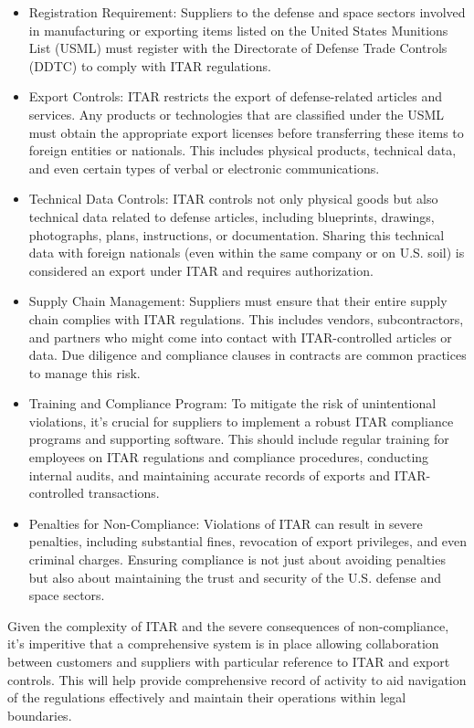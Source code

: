 \documentclass{tufte-handout}
\begin{document}
\begin{itemize}
\item Registration Requirement: Suppliers to the defense and space sectors involved in manufacturing or exporting items listed on the United States Munitions
List (USML) must register with the Directorate of Defense Trade Controls (DDTC) to comply with ITAR regulations.
\item Export Controls: ITAR restricts the export of defense-related articles and services. Any products or technologies that are classified under the USML must
obtain the appropriate export licenses before transferring these items to foreign entities or nationals. This includes physical products, technical data, and
even certain types of verbal or electronic communications.
\item Technical Data Controls: ITAR controls not only physical goods but also technical data related to defense articles, including blueprints, drawings, photographs,
plans, instructions, or documentation. Sharing this technical data with foreign nationals (even within the same company or on U.S. soil) is considered an export
under ITAR and requires authorization.
\item Supply Chain Management: Suppliers must ensure that their entire supply chain complies with ITAR regulations. This includes vendors, subcontractors, and partners
who might come into contact with ITAR-controlled articles or data. Due diligence and compliance clauses in contracts are common practices to manage this risk.
\item Training and Compliance Program: To mitigate the risk of unintentional violations, it's crucial for suppliers to implement a robust ITAR compliance programs and
supporting software. This should include regular training for employees on ITAR regulations and compliance procedures, conducting internal audits, and maintaining accurate
records of exports and ITAR-controlled transactions.
\item Penalties for Non-Compliance: Violations of ITAR can result in severe penalties, including substantial fines, revocation of export privileges, and even criminal
charges. Ensuring compliance is not just about avoiding penalties but also about maintaining the trust and security of the U.S. defense and space sectors.
\end{itemize}
Given the complexity of ITAR and the severe consequences of non-compliance, it's imperitive that a comprehensive system is in place allowing collaboration between
customers and suppliers with particular reference to ITAR and export controls.
This will help provide comprehensive record of activity to aid navigation of the regulations effectively and maintain their operations within legal boundaries.
\end{document}
